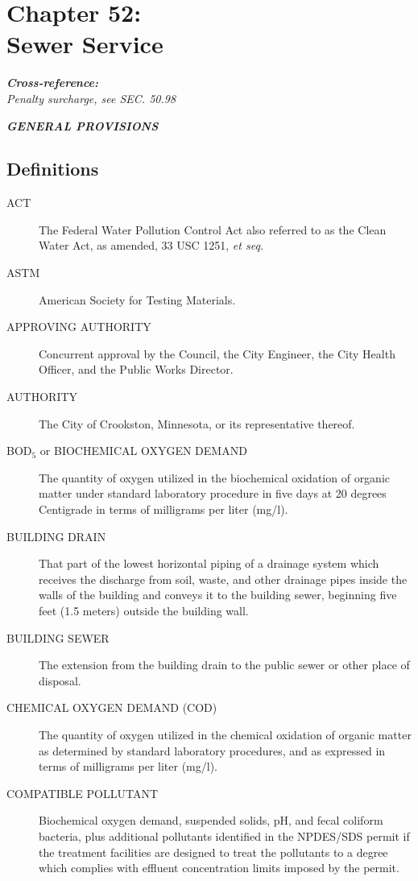 \chapter*{Chapter 52: \\
	Sewer Service}
    \minitoc
    \textbf{\emph{{Cross-reference:}}}\\
    \emph{Penalty surcharge, see SEC. 50.98}
    \pagebreak


\begin{center}
\emph{\textbf{\LARGE{GENERAL PROVISIONS}}}
\end{center}

\section{Definitions}
\begin{description}
\item[ACT] The Federal Water Pollution Control Act also referred to as the Clean Water Act, as amended, 33 USC 1251, \emph{et seq.}
\item[ASTM] American Society for Testing Materials.
\item[APPROVING AUTHORITY] Concurrent approval by the Council, the City Engineer, the City Health Officer, and the Public Works Director.
\item[AUTHORITY] The City of Crookston, Minnesota, or its representative thereof.
\item[BOD$_{5}$ or BIOCHEMICAL OXYGEN DEMAND] The quantity of oxygen utilized in the biochemical oxidation of organic matter under standard laboratory procedure in five days at 20 degrees Centigrade in terms of milligrams per liter (mg/l).
\item[BUILDING DRAIN] That part of the lowest horizontal piping of a drainage system which receives the discharge from soil, waste, and other drainage pipes inside the walls of the building and conveys it to the building sewer, beginning five feet (1.5 meters) outside the building wall.
\item[BUILDING SEWER] The extension from the building drain to the public sewer or other place of disposal.
\item[CHEMICAL OXYGEN DEMAND (COD)] The quantity of oxygen utilized in the chemical oxidation of organic matter as determined by standard laboratory procedures, and as expressed in terms of milligrams per liter (mg/l).
\item[COMPATIBLE POLLUTANT] Biochemical oxygen demand, suspended solids, pH, and fecal coliform bacteria, plus additional pollutants identified in the NPDES/SDS permit if the treatment facilities are designed to treat the pollutants to a degree which complies with effluent concentration limits imposed by the permit.

\end{description}
